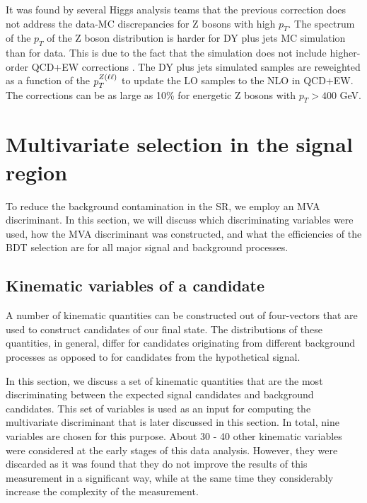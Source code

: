 \begin{itemize}
It was found by several Higgs analysis teams that the previous correction does not address the data-MC discrepancies for Z bosons with high $p_T$. The spectrum of the $p_T$ of the Z boson distribution is harder for DY plus jets MC simulation than for data. This is due to the fact that the simulation does not include higher-order QCD+EW corrections \cite{NLO_Vjets}. The DY plus jets simulated samples are reweighted as a function of the $p_T^{Z(\ell\ell)}$ to update the LO samples to the NLO in QCD+EW. The corrections can be as large as 10\% for energetic Z bosons with $p_T > 400$ GeV.

\end{itemize}

\section{Multivariate selection in the signal region}

To reduce the background contamination in the SR, we employ an MVA discriminant. In this section, we will discuss which discriminating variables were used, how the MVA discriminant was constructed, and what the efficiencies of the BDT selection are for all major signal and background processes. 
\label{sec:BDT}

\subsection{Kinematic variables of a candidate}
\label{sec:variables}

A number of kinematic quantities can be constructed out of four-vectors that are used to construct candidates of our final state. The distributions of these quantities, in general, differ for candidates originating from different background processes as opposed to for candidates from the hypothetical signal. 

In this section, we discuss a set of kinematic quantities that are the most discriminating between the expected signal candidates and background candidates. This set of variables is used as an input for computing the multivariate discriminant that is later discussed in this section. In total, nine variables are chosen for this purpose. About 30 - 40 other kinematic variables were considered at the early stages of this data analysis. However, they were discarded as it was found that they do not improve the results of this measurement in a significant way, while at the same time they considerably increase the complexity of the measurement.

